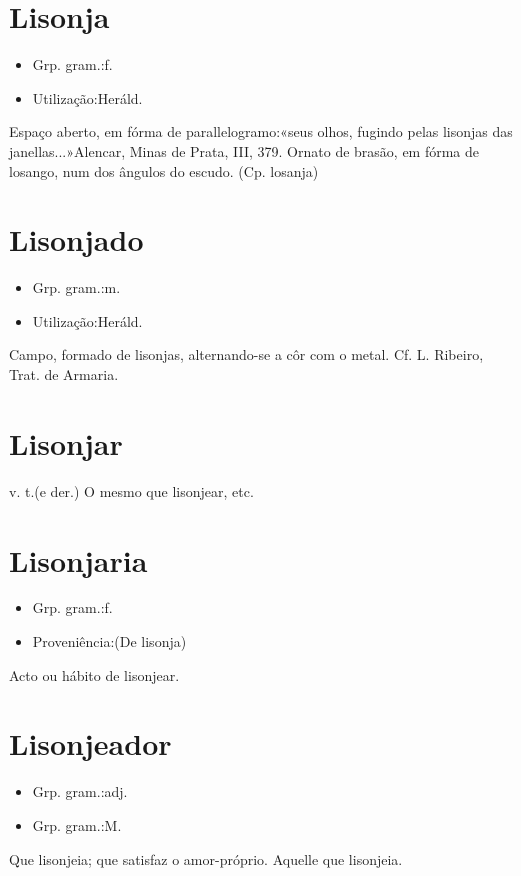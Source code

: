 \section{Lisonja}
\begin{itemize}
\item {Grp. gram.:f.}
\end{itemize}
\begin{itemize}
\item {Utilização:Heráld.}
\end{itemize}
Espaço aberto, em fórma de parallelogramo:«\textunderscore seus olhos, fugindo pelas lisonjas das janellas...\textunderscore »Alencar, \textunderscore Minas de Prata\textunderscore , III, 379.
Ornato de brasão, em fórma de losango, num dos ângulos do escudo.
(Cp. \textunderscore losanja\textunderscore )
\section{Lisonjado}
\begin{itemize}
\item {Grp. gram.:m.}
\end{itemize}
\begin{itemize}
\item {Utilização:Heráld.}
\end{itemize}
Campo, formado de lisonjas, alternando-se a côr com o metal. Cf. L. Ribeiro, \textunderscore Trat. de Armaria\textunderscore .
\section{Lisonjar}
\textunderscore v. t.\textunderscore  (e der.)
O mesmo que \textunderscore lisonjear\textunderscore , etc.
\section{Lisonjaria}
\begin{itemize}
\item {Grp. gram.:f.}
\end{itemize}
\begin{itemize}
\item {Proveniência:(De \textunderscore lisonja\textunderscore )}
\end{itemize}
Acto ou hábito de lisonjear.
\section{Lisonjeador}
\begin{itemize}
\item {Grp. gram.:adj.}
\end{itemize}
\begin{itemize}
\item {Grp. gram.:M.}
\end{itemize}
Que lisonjeia; que satisfaz o amor-próprio.
Aquelle que lisonjeia.
